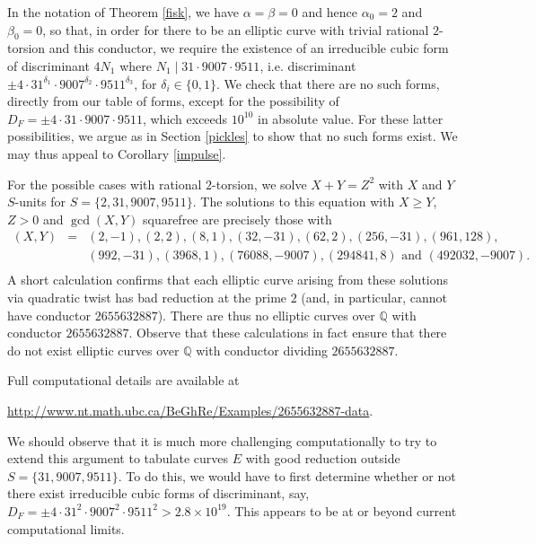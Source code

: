 In the notation of Theorem \ref{fisk}, we have $\alpha=\beta=0$ and hence $\alpha_0 =2$ and $\beta_0 =0$, so that, in order for there to be an elliptic curve with trivial rational $2$-torsion and this conductor, we require the existence of an irreducible cubic form of discriminant $4 N_1$ where 
$N_1 \mid  31 \cdot 9007 \cdot 9511$,
i.e. discriminant $\pm 4 \cdot 31^{\delta_1} \cdot 9007^{\delta_2} \cdot 9511^{\delta_3}$, for $\delta_i \in \{ 0, 1 \}$. We check that there are no such forms, directly from our table of forms, except for the possibility of $D_F = \pm 4 \cdot 31 \cdot 9007 \cdot 9511$, which exceeds $10^{10}$ in absolute value. For these latter possibilities, we argue as in Section \ref{pickles} to show that no such forms exist. We may thus appeal to Corollary \ref{impulse}.

For the possible cases with rational $2$-torsion, we solve $X+Y=Z^2$ with $X$ and $Y$ $S$-units for $S = \{ 2, 31, 9007, 9511 \}$. The solutions to this equation with $X \geq Y$, $Z > 0$ and $\gcd (X,Y)$ squarefree are precisely those with
$$
\begin{array}{lll}
(X,Y) &= &  (2,-1), (2,2), (8,1), (32,-31), (62,2), (256,-31), (961,128), \\
& & (992,-31), (3968,1), (76088,-9007), (294841, 8) \mbox{ and } (492032,-9007).  \\
\end{array}
$$
A short calculation confirms that each elliptic curve arising from these solutions via quadratic twist has bad reduction at the prime $2$ (and, in particular, cannot have conductor $2655632887$). There are thus no elliptic curves over $\mathbb{Q}$ with conductor $2655632887$.
Observe that these calculations in fact ensure that there do not exist elliptic curves over $\mathbb{Q}$ with conductor dividing $2655632887$. 

Full computational details are available at
\begin{center}
\url{http://www.nt.math.ubc.ca/BeGhRe/Examples/2655632887-data}.
\end{center}
We should observe that it is much more challenging computationally to try to extend this argument to tabulate curves $E$ with good reduction outside 
$S = \{ 31, 9007, 9511 \}$. To do this, we would have to first determine whether or not there exist irreducible cubic forms of discriminant, say,
$D_F = \pm 4 \cdot 31^2 \cdot 9007^2 \cdot 9511^2 > 2.8 \times 10^{19}$. This appears to be at or beyond current computational limits.

